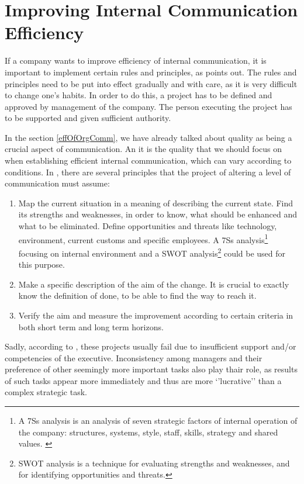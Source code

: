 \documentclass[11pt,singleside]{myfithesis2}
\begin{document}
	\section{Improving Internal Communication Efficiency}
If a company wants to improve efficiency of internal communication, it is important to implement certain rules and principles, as \cite{intCommManag} points out. The rules and principles need to be put into effect gradually and with care, as it is very difficult to change one's habits. In order to do this, a project has to be defined and approved by management of the company. The person executing the project has to be supported and given sufficient authority. 

In the section \ref{effOfOrgComm}, we have already talked about quality as being a crucial aspect of communication. An it is the quality that we should focus on when establishing efficient internal communication, which can vary according to conditions. In \cite{intCommManag}, there are several principles that the project of altering a level of communication must assume:
\begin{enumerate}
	\item Map the current situation in a meaning of describing the current state. Find its strengths and weaknesses, in order to know, what should be enhanced and what to be eliminated. Define opportunities and threats like technology, environment, current customs and specific employees. A 7Ss analysis\footnote{A 7Ss analysis is an analysis of seven strategic factors of internal operation of the company: structures, systems, style, staff, skills, strategy and shared values. \cite{intCommManag}} focusing on internal environment and a SWOT analysis\footnote{SWOT analysis is a technique for evaluating strengths and weaknesses, and for identifying opportunities and threats.} could be used for this purpose.
	\item Make a specific description of the aim of the change. It is crucial to exactly know the definition of done, to be able to find the way to reach it.
	\item Verify the aim and measure the improvement according to certain criteria in both short term and long term horizons.
\end{enumerate}

Sadly, according to \cite{intCommManag}, these projects usually fail due to insufficient support and/or competencies of the executive. Inconsistency among managers and their preference of other seemingly more important tasks also play thair role, as results of such tasks appear more immediately and thus are more `'lucrative'' than a complex strategic task.
\end{document}
